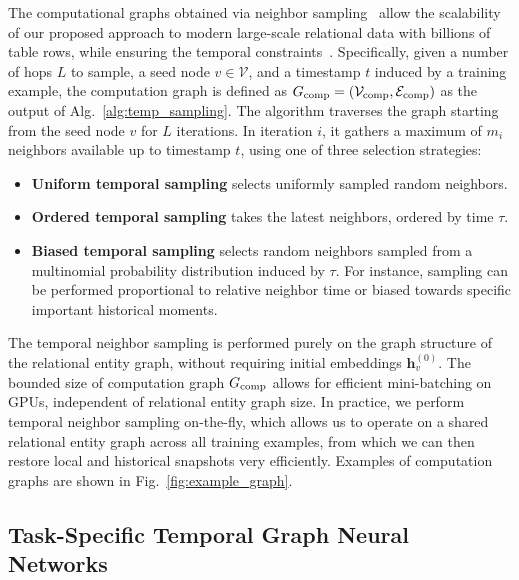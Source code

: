 The computational graphs obtained via neighbor sampling~\citep{hamilton2017inductive} allow the scalability of our proposed approach to modern large-scale relational data  with billions of table rows, while ensuring the temporal constraints~\citep{wang2021temporalsampling}.
Specifically, given a number of hops $L$ to sample, a seed node $v \in \mathcal{V}$, and a timestamp $t$ induced by a training example, the computation graph is defined as $G_{\rm comp} = (\mathcal{V}_{\rm comp}, \mathcal{E}_{\rm comp})$ as the output of Alg.~\ref{alg:temp_sampling}. 
The algorithm traverses the graph starting from the seed node $v$ for $L$ iterations. In iteration $i$, it gathers a maximum of $m_i$ neighbors available up to timestamp $t$, using one of three selection strategies:
\begin{itemize}
    \item \textbf{Uniform temporal sampling} selects uniformly sampled random neighbors.
    \item \textbf{Ordered temporal sampling} takes the latest neighbors, ordered by time $\tau$.
    \item \textbf{Biased temporal sampling} selects random neighbors sampled from a multinomial probability distribution induced by $\tau$. For instance, sampling can be performed proportional to relative neighbor time or biased towards specific important historical moments. 
\end{itemize}

The temporal neighbor sampling is performed purely on the graph structure of the relational entity graph, without requiring initial embeddings $\mathbf{h}^{(0)}_v$. The bounded size of computation graph $G_{\rm comp}$ allows for efficient mini-batching on GPUs, independent of relational entity graph size.
In practice, we perform temporal neighbor sampling on-the-fly, which allows us to operate on a shared relational entity graph across all training examples, from which we can then restore local and historical snapshots very efficiently.
Examples of computation graphs are shown in Fig.~\ref{fig:example_graph}.

\subsection{Task-Specific Temporal Graph Neural Networks}
\label{sec:task_specific_gnn} 

